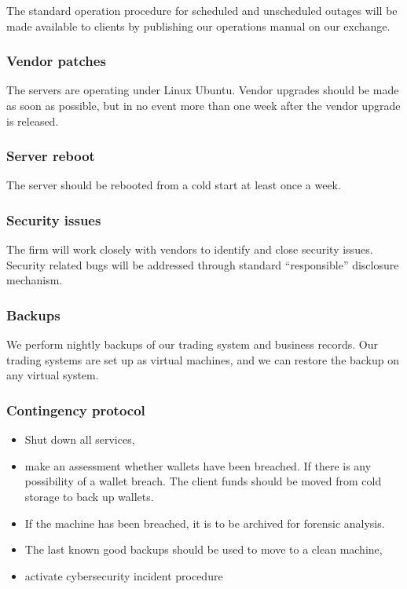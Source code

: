 The standard operation procedure for scheduled and unscheduled outages
will be made available to clients by publishing our operations manual
on our exchange.

\subsubsection{Vendor patches}
The servers are operating under Linux Ubuntu.  Vendor upgrades should
be made as soon as possible, but in no event more than one week after
the vendor upgrade is released.

\subsubsection{Server reboot}
The server should be rebooted from a cold start at least once a week.

\subsubsection{Security issues}
The firm will work closely with vendors to identify and close security
issues.  Security related bugs will be addressed through standard
``responsible'' disclosure mechanism.

\subsubsection{Backups}
We perform nightly backups of our trading system and business
records.  Our trading systems are set up as virtual machines, and we can
restore the backup on any virtual system.

\subsubsection{Contingency protocol}
\begin{itemize}
\item Shut down all services,
  \item make an assessment whether wallets have been breached.  If
    there is any possibility of a wallet breach.  The client funds should be
    moved from cold storage to back up wallets.
\item If the machine has been breached, it is to be archived for
  forensic analysis.
\item The last known good backups should be used to
  move to a clean machine,
\item activate cybersecurity incident procedure
\end{itemize}

